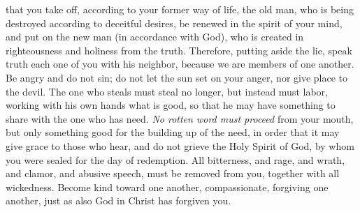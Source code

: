 \begin{biblechapter}
\verse that you take off, according to your former way of life, the old man, who is being destroyed according to deceitful desires,
\verse be renewed in the spirit of your mind,
\verse and put on the new man (in accordance with God), who is created in righteousness and holiness from the truth.
 Therefore, putting aside the lie, speak truth each one of you with his neighbor, because we are members of one another.
\verse Be angry and do not sin; do not let the sun set on your anger,
\verse nor give place to the devil.
\verse The one who steals must steal no longer, but instead must labor, working with his own hands what is good, so that he may have something to share with the one who has need.
\verse \textit{No rotten word must proceed} from your mouth, but only something good for the building up of the need, in order that it may give grace to those who hear,
\verse and do not grieve the Holy Spirit of God, by whom you were sealed for the day of redemption.
\verse All bitterness, and rage, and wrath, and clamor, and abusive speech, must be removed from you, together with all wickedness.
\verse Become kind toward one another, compassionate, forgiving one another, just as also God in Christ has forgiven you.
\end{biblechapter}

